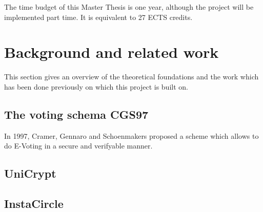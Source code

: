 \documentclass[numbers=noenddot, abstract=on]{scrreprt}
\begin{document}
The time budget of this Master Thesis is one year, although the project will be
implemented part time. It is equivalent to 27 ECTS credits. 

\chapter{Background and related work}
This section gives an overview of the theoretical foundations and the work which
has been done previously on which this project is built on.

\section{The voting schema CGS97}
In 1997, Cramer, Gennaro and Schoenmakers proposed a scheme which allows to
do E-Voting in a secure and verifyable manner. 

\section{UniCrypt}

\section{InstaCircle}

\printbibliography
\end{document}
